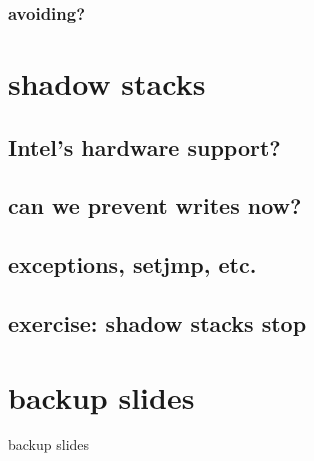 \subsubsection{avoiding?}




\section{shadow stacks}


\subsection{Intel's hardware support?}


\subsection{can we prevent writes now?}


\subsection{exceptions, setjmp, etc.}


\subsection{exercise: shadow stacks stop}




\section{backup slides}
\begin{frame}{backup slides}
\end{frame}


